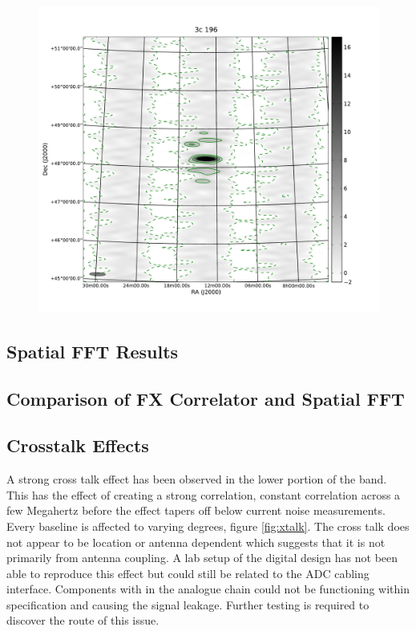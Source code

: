 \documentclass[useAMS,usenatbib,onecolumn]{mn2e}
\begin{document}
\begin{figure}
    \centering
    \includegraphics[scale=0.6]{graphics/3c196_01.pdf}
    \caption{}
    \label{fig:3c196_corr}
\end{figure}

\subsection{Spatial FFT Results}


\subsection{Comparison of FX Correlator and Spatial FFT}



\subsection{Crosstalk Effects}

A strong cross talk effect has been observed in the lower portion of the band.
This has the effect of creating a strong correlation, constant correlation across a few Megahertz before the effect tapers off below current noise measurements.
Every baseline is affected to varying degrees, figure \ref{fig:xtalk}.
The cross talk does not appear to be location or antenna dependent which suggests that it is not primarily from antenna coupling.
A lab setup of the digital design has not been able to reproduce this effect but could still be related to the ADC cabling interface.
Components with in the analogue chain could not be functioning within specification and causing the signal leakage.
Further testing is required to discover the route of this issue.
\end{document}
